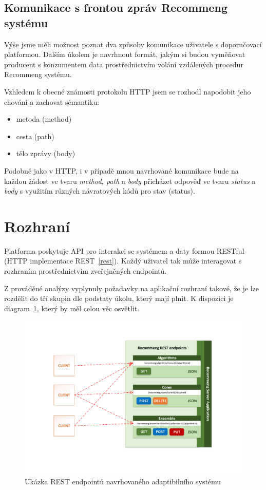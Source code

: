 \documentclass[thesis=M,czech]{FITthesis}[2014/05/07]
\begin{document}
\subsection{Komunikace s frontou zpráv Recommeng systému}

Výše jsme měli možnost poznat dva způsoby komunikace uživatele s doporučovací platformou. Dalším úkolem je navrhnout formát, jakým si budou vyměňovat producent s konzumentem data prostřednictvím volání vzdálených procedur Recommeng systému.

Vzhledem k obecné známosti protokolu HTTP jsem se rozhodl napodobit jeho chování a zachovat sémantiku:

\begin{itemize}
	\item metoda (method)
	\item cesta (path)
	\item tělo zprávy (body)
\end{itemize}

Podobně jako v HTTP, i v případě mnou navrhované komunikace bude na každou žádost ve tvaru \emph{method, path} a \emph{body} přicházet odpověď ve tvaru \emph{status} a \emph{body} s využitím různých návratových kódů pro stav (status).

\section{Rozhraní}

Platforma poskytuje API pro interakci se systémem a daty formou RESTful (HTTP implementace REST~\ref{rest}). Každý uživatel tak může interagovat s rozhraním prostřednictvím zveřejněných endpointů.

Z prováděné analýzy vyplynuly požadavky na aplikační rozhraní takové, že je lze rozdělit do tří skupin dle podstaty úkolu, který mají plnit. K dispozici je diagram~\ref{fig:rest}, který by měl celou věc osvětlit. 

\begin{figure}\centering
	\includegraphics[width=1.0\textwidth]{obr/DIPLOMKA_rest.pdf}
 	\caption[Ukázka REST endpointů navrhovaného adaptibilního systému]{Ukázka REST endpointů navrhovaného adaptibilního systému}\label{fig:rest}
\end{figure}	
\end{document}
